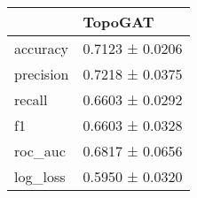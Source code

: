 \begin{tabular}{ll}
\toprule
 & TopoGAT \\
\midrule
accuracy & 0.7123 ± 0.0206 \\
precision & 0.7218 ± 0.0375 \\
recall & 0.6603 ± 0.0292 \\
f1 & 0.6603 ± 0.0328 \\
roc_auc & 0.6817 ± 0.0656 \\
log_loss & 0.5950 ± 0.0320 \\
\bottomrule
\end{tabular}
